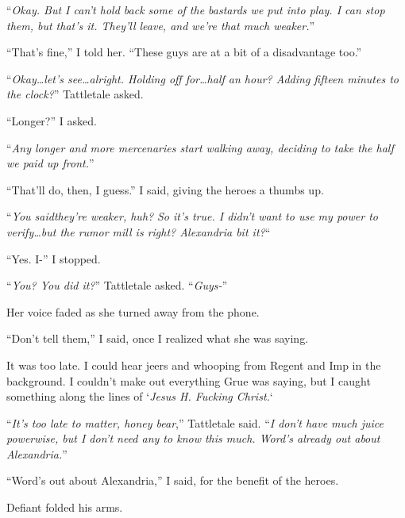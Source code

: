 ``\emph{Okay.  But I can't hold back some of the bastards we put into play.  I can stop them, but that's it.  They'll leave, and we're that much weaker.}''



``That's fine,'' I told her.  ``These guys are at a bit of a disadvantage too.''



``\emph{Okay\ldots let's see\ldots alright.  Holding off for\ldots half an hour?  Adding fifteen minutes to the clock?}'' Tattletale asked.



``Longer?'' I asked.



``\emph{Any longer and more mercenaries start walking away, deciding to take the half we paid up front.}''



``That'll do, then, I guess.''  I said, giving the heroes a thumbs up.



``\emph{You said}\emph{they're weaker, huh?  }\emph{So it's true.  I didn't want to use my power to verify\ldots but the rumor mill is right?  Alexandria bit it?}``



``Yes.  I-'' I stopped.



``\emph{You?  You did it?}''  Tattletale asked.  ``\emph{Guys-}''



Her voice faded as she turned away from the phone.



``Don't tell them,'' I said, once I realized what she was saying.



It was too late.  I could hear jeers and whooping from Regent and Imp in the background.  I couldn't make out everything Grue was saying, but I caught something along the lines of `\emph{Jesus H. Fucking Christ.}`



``\emph{It's too late to matter, honey bear},'' Tattletale said.  ``\emph{I don't have much juice powerwise, but I don't need any to know this much.  Word's already out about Alexandria.}''



``Word's out about Alexandria,'' I said, for the benefit of the heroes.



Defiant folded his arms.



